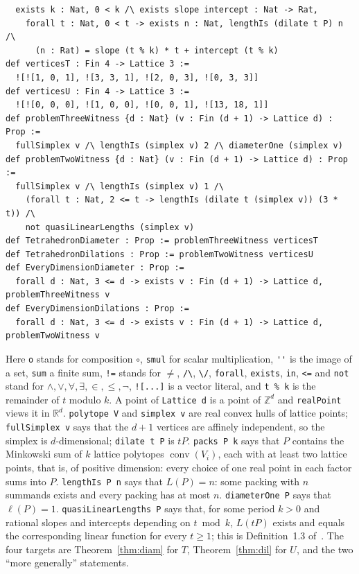 \documentclass[11pt]{article}
\theoremstyle{definition}
\theoremstyle{remark}
\newcommand{\Z}{\mathbb Z}
\newcommand{\R}{\mathbb R}
\DeclareMathOperator{\conv}{conv}
\begin{document}
{{\begin{verbatim}
  exists k : Nat, 0 < k /\ exists slope intercept : Nat -> Rat,
    forall t : Nat, 0 < t -> exists n : Nat, lengthIs (dilate t P) n /\
      (n : Rat) = slope (t % k) * t + intercept (t % k)
def verticesT : Fin 4 -> Lattice 3 :=
  ![![1, 0, 1], ![3, 3, 1], ![2, 0, 3], ![0, 3, 3]]
def verticesU : Fin 4 -> Lattice 3 :=
  ![![0, 0, 0], ![1, 0, 0], ![0, 0, 1], ![13, 18, 1]]
def problemThreeWitness {d : Nat} (v : Fin (d + 1) -> Lattice d) : Prop :=
  fullSimplex v /\ lengthIs (simplex v) 2 /\ diameterOne (simplex v)
def problemTwoWitness {d : Nat} (v : Fin (d + 1) -> Lattice d) : Prop :=
  fullSimplex v /\ lengthIs (simplex v) 1 /\
    (forall t : Nat, 2 <= t -> lengthIs (dilate t (simplex v)) (3 * t)) /\
    not quasiLinearLengths (simplex v)
def TetrahedronDiameter : Prop := problemThreeWitness verticesT
def TetrahedronDilations : Prop := problemTwoWitness verticesU
def EveryDimensionDiameter : Prop :=
  forall d : Nat, 3 <= d -> exists v : Fin (d + 1) -> Lattice d, problemThreeWitness v
def EveryDimensionDilations : Prop :=
  forall d : Nat, 3 <= d -> exists v : Fin (d + 1) -> Lattice d, problemTwoWitness v
\end{verbatim}}
\noindent Here \texttt{o} stands for composition $\circ$, \texttt{smul} for
scalar multiplication, \verb|''| is the image of a set, \texttt{sum} a
finite sum, \verb|!=| stands for $\ne$, \verb|/\|, \verb|\/|,
\texttt{forall}, \texttt{exists}, \texttt{in}, \verb|<=| and \texttt{not}
stand for $\wedge,\vee,\forall,\exists,\in,\le,\neg$, \verb|![...]| is a vector
literal, and \verb|t % k| is the remainder of $t$ modulo $k$. A point of
\texttt{Lattice d} is a point of $\Z^d$ and \texttt{realPoint} views it in
$\R^d$. \texttt{polytope V} and \texttt{simplex v} are real convex hulls of
lattice points; \texttt{fullSimplex v} says that the $d+1$ vertices are
affinely independent, so the simplex is $d$-dimensional; \texttt{dilate t P}
is $tP$. \texttt{packs P k} says that $P$ contains the Minkowski sum of $k$
lattice polytopes $\conv(V_i)$, each with at least two lattice points, that
is, of positive dimension: every choice of one real point in each factor sums
into $P$. \texttt{lengthIs P n} says that $L(P)=n$: some packing with $n$
summands exists and every packing has at most $n$. \texttt{diameterOne P}
says that $\ell(P)=1$. \texttt{quasiLinearLengths P} says that, for some
period $k>0$ and rational slopes and intercepts depending on $t\bmod k$,
$L(tP)$ exists and equals the corresponding linear function for every
$t\ge1$; this is Definition~1.3 of~\cite{ss}. The four targets are
Theorem~\ref{thm:diam} for $T$, Theorem~\ref{thm:dil} for $U$, and the two
``more generally'' statements.

}
\end{document}
